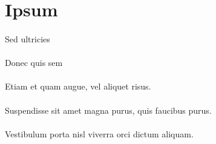 \section{Ipsum}
\paragraph{}
Sed ultricies 

\paragraph{}
Donec quis sem 

\paragraph{}
Etiam et quam augue, vel aliquet risus. 

\paragraph{}
Suspendisse sit amet magna purus, quis faucibus purus. 

\paragraph{}
Vestibulum porta nisl viverra orci dictum aliquam. 
